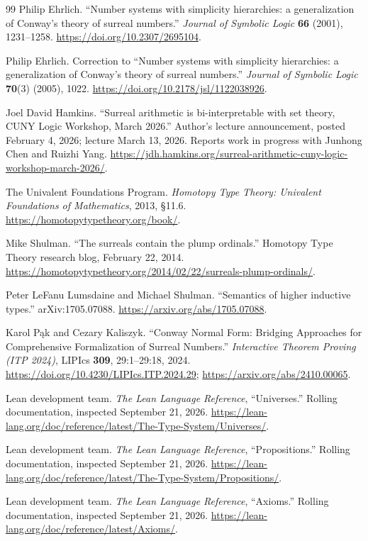 \documentclass[11pt,letterpaper]{article}
\theoremstyle{definition}
\theoremstyle{remark}
\numberwithin{equation}{section}
\begin{document}
\begin{thebibliography}{99}
Philip Ehrlich. ``Number systems with simplicity hierarchies: a generalization of Conway's theory of surreal numbers.'' \emph{Journal of Symbolic Logic} \textbf{66} (2001), 1231--1258.
\url{https://doi.org/10.2307/2695104}.

Philip Ehrlich. Correction to ``Number systems with simplicity hierarchies: a generalization of Conway's theory of surreal numbers.'' \emph{Journal of Symbolic Logic} \textbf{70}(3) (2005), 1022.
\url{https://doi.org/10.2178/jsl/1122038926}.

Joel David Hamkins. ``Surreal arithmetic is bi-interpretable with set theory, CUNY Logic Workshop, March 2026.'' Author's lecture announcement, posted February 4, 2026; lecture March 13, 2026. Reports work in progress with Junhong Chen and Ruizhi Yang.
\url{https://jdh.hamkins.org/surreal-arithmetic-cuny-logic-workshop-march-2026/}.

The Univalent Foundations Program. \emph{Homotopy Type Theory: Univalent Foundations of Mathematics}, 2013, \S11.6.
\url{https://homotopytypetheory.org/book/}.

Mike Shulman. ``The surreals contain the plump ordinals.'' Homotopy Type Theory research blog, February 22, 2014.
\url{https://homotopytypetheory.org/2014/02/22/surreals-plump-ordinals/}.

Peter LeFanu Lumsdaine and Michael Shulman. ``Semantics of higher inductive types.'' arXiv:1705.07088.
\url{https://arxiv.org/abs/1705.07088}.

Karol P\k{a}k and Cezary Kaliszyk. ``Conway Normal Form: Bridging Approaches for Comprehensive Formalization of Surreal Numbers.'' \emph{Interactive Theorem Proving (ITP 2024)}, LIPIcs \textbf{309}, 29:1--29:18, 2024.
\url{https://doi.org/10.4230/LIPIcs.ITP.2024.29};
\url{https://arxiv.org/abs/2410.00065}.

Lean development team. \emph{The Lean Language Reference}, ``Universes.'' Rolling documentation, inspected September 21, 2026.
\url{https://lean-lang.org/doc/reference/latest/The-Type-System/Universes/}.

Lean development team. \emph{The Lean Language Reference}, ``Propositions.'' Rolling documentation, inspected September 21, 2026.
\url{https://lean-lang.org/doc/reference/latest/The-Type-System/Propositions/}.

Lean development team. \emph{The Lean Language Reference}, ``Axioms.'' Rolling documentation, inspected September 21, 2026.
\url{https://lean-lang.org/doc/reference/latest/Axioms/}.


\end{thebibliography}
\end{document}
